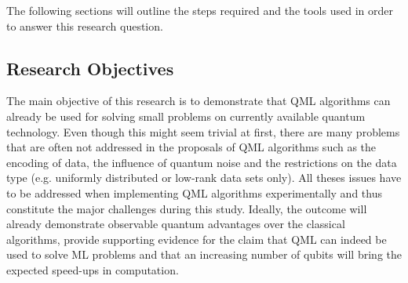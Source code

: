\documentclass[a4paper]{article}
\newcommand*{\0}{$\ket{0}$}
\newcommand*{\1}{$\ket{1}$}
\begin{document}

\flushleft
The following sections will outline the steps required and the tools used in order to answer this research question. 

\newpage
\subsection{Research Objectives}
\label{subsec:researchobjectives}

The main objective of this research is to demonstrate that QML algorithms can already be used for solving small problems on currently available quantum technology. Even though this might seem trivial at first, there are many problems that are often not addressed in the proposals of QML algorithms such as the encoding of data, the influence of quantum noise and the restrictions on the data type (e.g. uniformly distributed or low-rank data sets only). All theses issues have to be addressed when implementing QML algorithms experimentally and thus constitute the major challenges during this study. 
Ideally, the outcome will already demonstrate observable quantum advantages over the classical algorithms, provide supporting evidence for the claim that QML can indeed be used to solve ML problems and that an increasing number of qubits will bring the expected speed-ups in computation.


\end{document}
